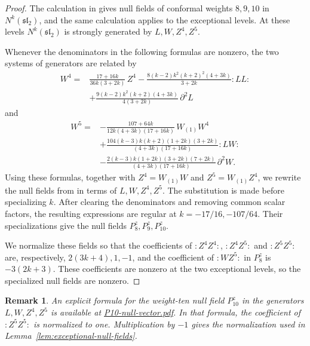 \documentclass[11 pt]{amsart}
\newtheorem{remark}{Remark}
\theoremstyle{definition}
\theoremstyle{plain}
\begin{document}
\begin{proof}
The calculation in \cite[Section~2 and Appendix~C]{DLY} gives null
fields of conformal weights $8,9,10$ in $N^k(\mathfrak{sl}_2)$, and the
same calculation applies to the exceptional levels.  At these levels
$N^k(\mathfrak{sl}_2)$ is strongly generated by $L,W,Z^4,Z^5$.

Whenever the denominators in the following formulas are nonzero, the
two systems of generators are related by
\[
\begin{aligned}
W^4={}&\frac{17+16k}{36k(3+2k)}\,Z^4
-\frac{8(k-2)k^2(k+2)^2(4+3k)}{3+2k}:LL: \\
&+\frac{9(k-2)k^2(k+2)(4+3k)}{4(3+2k)}\,\partial^2L
\end{aligned}
\]
and
\[
\begin{aligned}
W^5={}&-\frac{107+64k}{12k(4+3k)(17+16k)}\,W_{(1)}W^4 \\
&+\frac{104(k-3)k(k+2)(1+2k)(3+2k)}
  {(4+3k)(17+16k)}:LW: \\
&-\frac{2(k-3)k(1+2k)(3+2k)(7+2k)}
  {(4+3k)(17+16k)}\,\partial^2W .
\end{aligned}
\]
Using these formulas, together with
$Z^4=W_{(1)}W$ and $Z^5=W_{(1)}Z^4$,
we rewrite the null fields from \cite{DLY} in terms of
$L,W,Z^4,Z^5$.  The substitution is made before specializing $k$.
After clearing the denominators and removing common scalar factors, the
resulting expressions are regular at
$k=-17/16,-107/64$.
Their specializations give the null fields
$P_8^z,P_9^z,P_{10}^z$.

We normalize these fields so that the coefficients of
$:Z^4Z^4:$, $:Z^4Z^5:$ and $:Z^5Z^5:$ are, respectively,
$
2(3k+4), 1, -1$,
and the coefficient of $:WZ^5:$ in $P_8^z$ is $-3(2k+3)$.
These coefficients are nonzero at the two exceptional levels, so the
specialized null fields are nonzero.
\end{proof}

\begin{remark}\label{rem:P10-supplement}
An explicit formula for the weight-ten null field $P_{10}^z$ in the generators
$L,W,Z^4,Z^5$ is available at
\href{https://www.dropbox.com/scl/fi/dm0o130us5l05dl4xj7wb/P10-null-vector.pdf?rlkey=t8ofxxicvsqgkmxftod251nwb&dl=0}{P10-null-vector.pdf}.
In that formula, the coefficient of $:Z^5Z^5:$ is normalized to one.
Multiplication by $-1$ gives the normalization used in
Lemma~\ref{lem:exceptional-null-fields}.
\end{remark}
\end{document}
